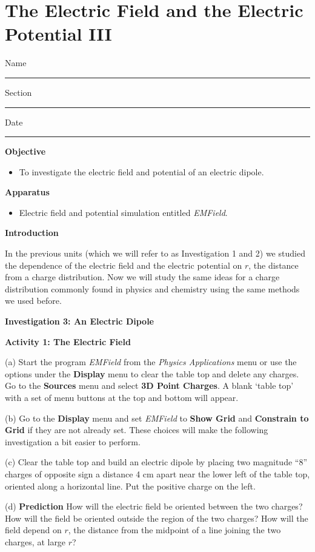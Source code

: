 
\section{The Electric Field and the Electric Potential III}

Name \rule{2.0in}{0.1pt}\hfill{}Section \rule{1.0in}{0.1pt}\hfill{}Date
\rule{1.0in}{0.1pt}

\textbf{Objective}

\begin{itemize}
\item To investigate the electric field and potential of an electric dipole.
\end{itemize}

\textbf{Apparatus}

\begin{itemize}
\item Electric field and potential simulation entitled {\it EMField}.
\end{itemize}

\textbf{Introduction}

In the previous units (which we will refer to as Investigation 1 and 2) we studied the dependence
of the electric field and the electric potential on $r$, the distance from
a charge distribution.
Now we will study the same ideas for a charge distribution commonly found in physics and chemistry
using the same methods we used before.

\textbf{Investigation 3: An Electric Dipole}

\textbf{Activity 1: The Electric Field}

(a) Start the program {\it EMField} from the {\it Physics Applications} menu or use the options under the 
\textbf{Display} menu to clear the table top and delete any charges.
Go to the \textbf{Sources} menu and select \textbf{3D Point Charges}.
A blank `table top' with a set of menu 
buttons at the top and bottom will appear.

(b) Go to the {\bf Display} menu and set {\it EMField} to
{\bf Show Grid} and {\bf Constrain to Grid} if they are not already set.
These choices will make the following investigation a bit easier to perform.

(c) Clear the table top and build an electric dipole by placing two magnitude
{}``8'' charges of opposite sign a distance 4 cm apart near the lower left 
of the table top, oriented along a horizontal line. Put the positive charge 
on the left.


(d) {\bf Prediction} How will the electric field be oriented between the two charges? How will the field be oriented outside the region of the two charges?
How will the field depend on $r$, the distance from the midpoint of a line joining the two charges, at large $r$?
\vspace{25mm}

